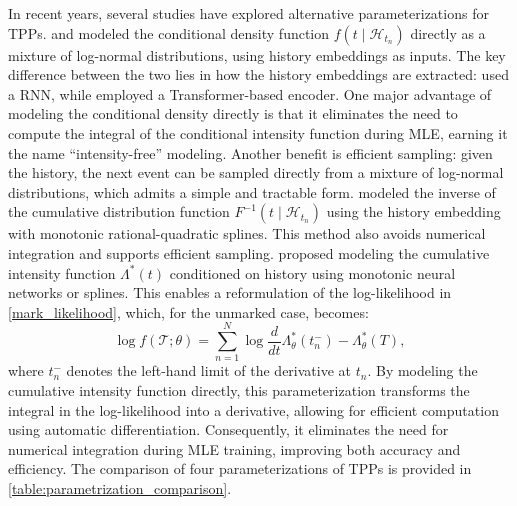 \documentclass[10pt]{article} %
\begin{document}
In recent years, several studies have explored alternative parameterizations for TPPs. 
\citet{shchur2019intensity} and \citet{panosdecomposable} modeled the conditional density function \(f(t \mid \mathcal{H}_{t_n})\) directly as a mixture of log-normal distributions, using history embeddings as inputs. 
The key difference between the two lies in how the history embeddings are extracted: \citet{shchur2019intensity} used a RNN, while \citet{panosdecomposable} employed a Transformer-based encoder. 
One major advantage of modeling the conditional density directly is that it eliminates the need to compute the integral of the conditional intensity function during MLE, earning it the name “intensity-free” modeling.  
Another benefit is efficient sampling: given the history, the next event can be sampled directly from a mixture of log-normal distributions, which admits a simple and tractable form. 
\citet{taieb2022learning} modeled the inverse of the cumulative distribution function \(F^{-1}(t \mid \mathcal{H}_{t_n})\) using the history embedding with monotonic rational-quadratic splines. This method also avoids numerical integration and supports efficient sampling. 
\citet{omi2019fully,oleksandr2020fast,liu2024cumulative} proposed modeling the cumulative intensity function \(\Lambda^*(t)\) conditioned on history using monotonic neural networks or splines. This enables a reformulation of the log-likelihood in \cref{mark_likelihood}, which, for the unmarked case, becomes: 
\begin{equation}
    \log f(\mathcal{T};\theta) = \sum_{n=1}^{N} \log\frac{d}{dt}\Lambda_{\theta}^*(t_n^-) - \Lambda_\theta^*(T), 
\label{CCIF-likelihood}
\end{equation}
where \( t_n^- \) denotes the left-hand limit of the derivative at \( t_n \).  
By modeling the cumulative intensity function directly, this parameterization transforms the integral in the log-likelihood into a derivative, allowing for efficient computation using automatic differentiation. Consequently, it eliminates the need for numerical integration during MLE training, improving both accuracy and efficiency. 
The comparison of four parameterizations of TPPs is provided in \cref{table:parametrization_comparison}. 
\end{document}
